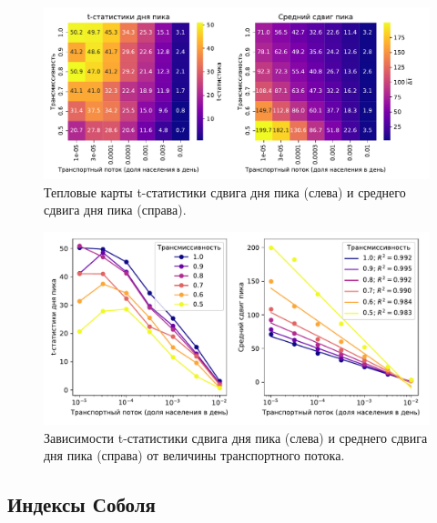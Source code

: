 \documentclass[a4paper,12pt]{article} %
\begin{document}
\begin{figure}[H]
    \centering
    \includegraphics[width=\linewidth]{images/flows_heatmap_conference.pdf}
    \caption{Тепловые карты t-статистики сдвига дня пика (слева) и среднего сдвига дня пика (справа).}
    \label{pic:flows_heatmap_conference}
\end{figure}

\begin{figure}[H]
    \centering
    \includegraphics[width=\linewidth]{images/flows_lines.pdf}
    \caption{Зависимости t-статистики сдвига дня пика (слева) и среднего сдвига дня пика (справа) от величины транспортного потока.}
    \label{pic:flows_lines}
\end{figure}



\subsection{Индексы Соболя}
\end{document}
